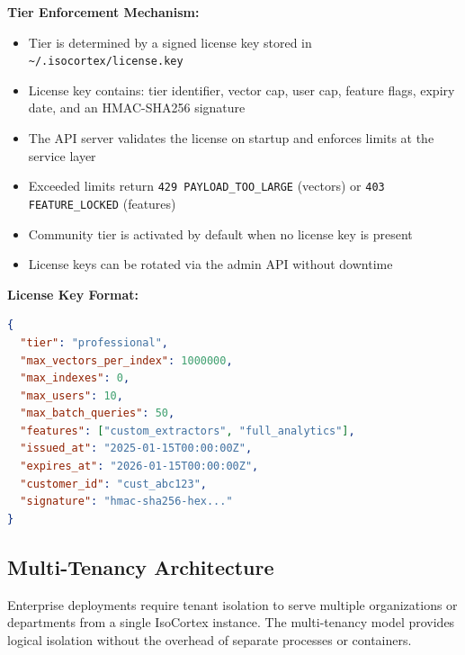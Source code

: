 \documentclass[11pt,a4paper]{article}
\newcommand{\inlinecode}[1]{\texttt{\small\colorbox{ctCodeBg}{#1}}}
\begin{document}
\textbf{Tier Enforcement Mechanism:}
\begin{itemize}
    \item Tier is determined by a signed license key stored in \inlinecode{\textasciitilde/.isocortex/license.key}
    \item License key contains: tier identifier, vector cap, user cap, feature flags, expiry date, and an HMAC-SHA256 signature
    \item The API server validates the license on startup and enforces limits at the service layer
    \item Exceeded limits return \texttt{429 PAYLOAD\_TOO\_LARGE} (vectors) or \texttt{403 FEATURE\_LOCKED} (features)
    \item Community tier is activated by default when no license key is present
    \item License keys can be rotated via the admin API without downtime
\end{itemize}

\textbf{License Key Format:}
\begin{lstlisting}[language=JSON]
{
  "tier": "professional",
  "max_vectors_per_index": 1000000,
  "max_indexes": 0,
  "max_users": 10,
  "max_batch_queries": 50,
  "features": ["custom_extractors", "full_analytics"],
  "issued_at": "2025-01-15T00:00:00Z",
  "expires_at": "2026-01-15T00:00:00Z",
  "customer_id": "cust_abc123",
  "signature": "hmac-sha256-hex..."
}
\end{lstlisting}

\subsection{Multi-Tenancy Architecture}

Enterprise deployments require tenant isolation to serve multiple organizations or departments from a single IsoCortex instance. The multi-tenancy model provides logical isolation without the overhead of separate processes or containers.
\end{document}
